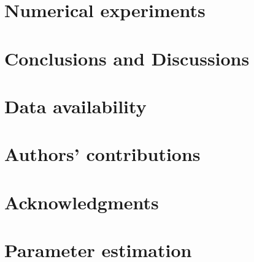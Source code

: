 \documentclass[3p, sort&compress]{elsarticle}
\begin{document}
    \section{Numerical experiments}
        
    \section{Conclusions and Discussions}
        
    \section*{Data availability}
        
    \section*{Authors’ contributions}
        
    \section*{Acknowledgments}
        
    
    
    \appendix
    \section{Parameter estimation}
    \label{apx:positivity_invariace}
        
\end{document}
